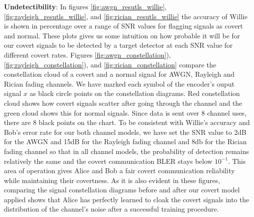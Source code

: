 \textbf{Undetectibility}: In figures \ref{fig:awgn_resutls_willie}, \ref{fig:rayleigh_resutls_willie}, and \ref{fig:rician_resutls_willie} the accuracy of Willie is shown in percentage over a range of SNR values for flagging signals as covert and normal. These plots gives us some intuition on how probable it will be for our covert signals to be detected by a target detector at each SNR value for different covert rates. Figures \ref{fig:awgn_constellation}),\ref{fig:rayleigh_constellation}), and \ref{fig:rician_constellation} compare the constellation cloud of a covert and a normal signal for AWGN, Rayleigh and Rician fading channels. We have marked each symbol of the encoder's ouput signal \(x\) as black circle points on the constellation diagrams. Red constellation cloud shows how covert signals scatter after going through the channel and the green cloud shows this for normal signals. Since data is sent over 8 channel uses, there are 8 black points on the chart. To be consistent with Willie's accuracy and Bob's error rate for our both channel models, we have set the SNR value to 2dB for the AWGN and 15dB for the Rayleigh fading channel and 8db for the Rician fading channel so that in all channel models, the probability of detection remains relatively the same and the covert communication BLER stays below \(10^{-1}\). This area of operation gives Alice and Bob a fair covert communication reliability while maintaining their covertness. As it is also evident in these figures, comparing the signal constellation diagrams before and after our covert model applied shows that Alice has perfectly learned to cloak the covert signals into the distribution of the channel's noise after a successful training procedure.

